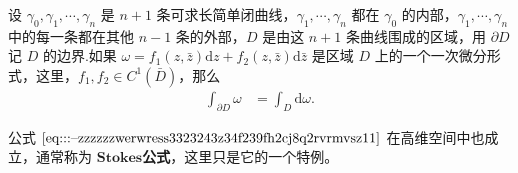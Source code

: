 \documentclass[../../main.tex]{subfiles}%
\begin{document}
\begin{theorem}[Green公式]\label{theorem:Green公式-复变函数形式}
设 \( \gamma_0, \gamma_1, \cdots, \gamma_n \) 是 \( n + 1 \) 条可求长简单闭曲线，\( \gamma_1, \cdots, \gamma_n \) 都在 \( \gamma_0 \) 的内部，\( \gamma_1, \cdots, \gamma_n \) 中的每一条都在其他 \( n - 1 \) 条的外部，\( D \) 是由这 \( n + 1 \) 条曲线围成的区域，用 \(\partial D \) 记 \( D \) 的边界.如果 \( \omega = f_1(z,\bar{z})\mathrm{d}z + f_2(z,\bar{z})\mathrm{d}\bar{z} \) 是区域 \( D \) 上的一个一次微分形式，这里，\( f_1,f_2 \in C^1(\bar{D}) \)，那么
\begin{align}
\int_{\partial D} \omega &= \int_D \mathrm{d}\omega. \label{eq:::--zzzzzzwerwress3323243z34f239fh2cj8q2rvrmvsz11}
\end{align}
\end{theorem}
\begin{remark}
公式 \(\eqref{eq:::--zzzzzzwerwress3323243z34f239fh2cj8q2rvrmvsz11}\) 在高维空间中也成立，通常称为 $\mathbf{Stokes}$\textbf{公式}，这里只是它的一个特例。
\end{remark}
\end{document}
